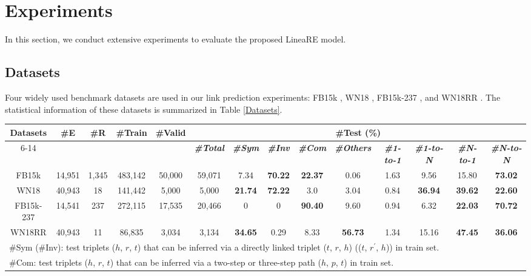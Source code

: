 \documentclass[conference]{IEEEtran}
\begin{document}
\section{Experiments}
In this section, we conduct extensive experiments to evaluate the proposed LineaRE model.

\subsection{Datasets}
Four widely used benchmark datasets are used in our link prediction experiments: FB15k \cite{TransE}, WN18 \cite{TransE}, FB15k-237 \cite{Toutanova2015Observed}, and WN18RR \cite{ConvE}. The statistical information of these datasets is summarized in Table \ref{Datasets}.
\begin{table*}[t]
	\caption{
		Statistical information of the datasets used in experiments.
	}
	\label{Datasets}
	\begin{center}
	\begin{tabular}{|c|c|c|c|c|c||c|c|c|c||c|c|c|c|}
		\hline
		\multirow{2}{*}{\textbf{Datasets}}
		& \multirow{2}{*}{\textbf{\#E}}
		& \multirow{2}{*}{\textbf{\#R}}
		& \multirow{2}{*}{\textbf{\#Train}}
		& \multirow{2}{*}{\textbf{\#Valid}}
		& \multicolumn{9}{c|}{\textbf{\#Test (\%)}}  \\
		\cline{6-14}
		&&&&
		& \textbf{\textit{\#Total}}
		& \textbf{\textit{\#Sym}}	& \textbf{\textit{\#Inv}}	& \textbf{\textit{\#Com}}
		& \textbf{\textit{\#Others}}
		& \textbf{\textit{\#1-to-1}}  & \textbf{\textit{\#1-to-N}}  & \textbf{\textit{\#N-to-1}}
		& \textbf{\textit{\#N-to-N}} \\
		\hline
		FB15k
		& 14,951 & 1,345 & 483,142 & 50,000 & 59,071
		& 7.34	& \textbf{70.22}	& \textbf{22.37}	& 0.06
		& 1.63	& 9.56				& 15.80				& \textbf{73.02} \\
		\hline
		WN18
		& 40,943 & 18	 & 141,442 & 5,000  & 5,000
		& \textbf{21.74}	& \textbf{72.22}	& 3.0				& 3.04
		& 0.84				& \textbf{36.94}	& \textbf{39.62}	& \textbf{22.60}  \\
		\hline
		FB15k-237
		& 14,541	& 237	& 272,115	& 17,535	& 20,466
		& 0		& 0		& \textbf{90.40}	& 9.60
		& 0.94	& 6.32	& \textbf{22.03}	& \textbf{70.72}  \\
		\hline
		WN18RR
		& 40,943 & 11    & 86,835  & 3,034	& 3,134
		& \textbf{34.65}	& 0.29	& 8.33				& \textbf{56.73}
		& 1.34				& 15.16	& \textbf{47.45}	& \textbf{36.06} \\
		\hline
		\multicolumn{14}{l}{
			\#Sym (\#Inv): test triplets ($h$, $r$, $t$) that can be inferred via a directly linked triplet ($t$, $r$, $h$) (($t$, $r^{'}$, $h$)) in train set.
		} \\
		\multicolumn{14}{l}{
			\#Com: test triplets ($h$, $r$, $t$) that can be inferred via a two-step or three-step path ($h$, $p$, $t$) in train set.
		} \\
	\end{tabular}
	\end{center}
\end{table*}
\end{document}
